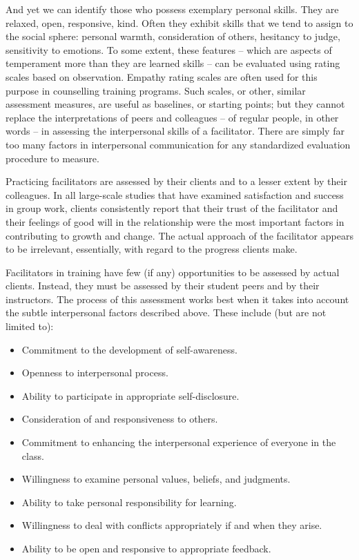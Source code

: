 \documentclass[letterpaper,10pt,headsepline]{scrreprt}
\begin{document}
And yet we can identify those who possess exemplary personal skills. They are relaxed, open, responsive, kind. Often they exhibit skills that we tend to assign to the social sphere: personal warmth, consideration of others, hesitancy to judge, sensitivity to emotions. To some extent, these features -- which are aspects of temperament more than they are learned skills -- can be evaluated using rating scales based on observation. Empathy rating scales are often used for this purpose in counselling training programs. Such scales, or other, similar assessment measures, are useful as baselines, or starting points; but they cannot replace the interpretations of peers and colleagues -- of regular people, in other words -- in assessing the interpersonal skills of a facilitator. There are simply far too many factors in interpersonal communication for any standardized evaluation procedure to measure.

Practicing facilitators are assessed by their clients and to a lesser extent by their colleagues. In all large-scale studies that have examined satisfaction and success in group work, clients consistently report that their trust of the facilitator and their feelings of good will in the relationship were the most important factors in contributing to growth and change. The actual approach of the facilitator appears to be irrelevant, essentially, with regard to the progress clients make.

Facilitators in training have few (if any) opportunities to be assessed by actual clients. Instead, they must be assessed by their student peers and by their instructors. The process of this assessment works best when it takes into account the subtle interpersonal factors described above. These include (but are not limited to):

\begin{itemize}
\item Commitment to the development of self-awareness.
\item Openness to interpersonal process.
\item Ability to participate in appropriate self-disclosure.
\item Consideration of and responsiveness to others.
\item Commitment to enhancing the interpersonal experience of everyone in the class.
\item Willingness to examine personal values, beliefs, and judgments.
\item Ability to take personal responsibility for learning.
\item Willingness to deal with conflicts appropriately if and when they arise.
\item Ability to be open and responsive to appropriate feedback.
\end{itemize}
\end{document}
